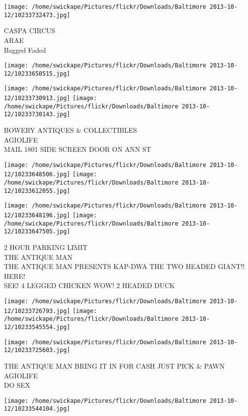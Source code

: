 \documentclass[10pt,letterpaper]{article}
\begin{document}
\texttt{[image: /home/swickape/Pictures/flickr/Downloads/Baltimore 2013-10-12/10233732473.jpg]}

CASPA CIRCUS\\
ARAE\\
Bagged Faded
\pagebreak

\texttt{[image: /home/swickape/Pictures/flickr/Downloads/Baltimore 2013-10-12/10233650515.jpg]}

\vspace{0.25in}
\texttt{[image: /home/swickape/Pictures/flickr/Downloads/Baltimore 2013-10-12/10233730913.jpg]}
\texttt{[image: /home/swickape/Pictures/flickr/Downloads/Baltimore 2013-10-12/10233730143.jpg]}

BOWERY ANTIQUES \& COLLECTIBLES\\
AGIOLIFE\\
MAIL 1801 SIDE SCREEN DOOR ON ANN ST
\pagebreak

\texttt{[image: /home/swickape/Pictures/flickr/Downloads/Baltimore 2013-10-12/10233648506.jpg]}
\texttt{[image: /home/swickape/Pictures/flickr/Downloads/Baltimore 2013-10-12/10233612055.jpg]}

\texttt{[image: /home/swickape/Pictures/flickr/Downloads/Baltimore 2013-10-12/10233648196.jpg]}
\texttt{[image: /home/swickape/Pictures/flickr/Downloads/Baltimore 2013-10-12/10233647505.jpg]}

2 HOUR PARKING LIMIT\\
THE ANTIQUE MAN\\
THE ANTIQUE MAN PRESENTS KAP{-}DWA THE TWO HEADED GIANT!! HERE!\\
SEE! 4 LEGGED CHICKEN WOW! 2 HEADED DUCK
\pagebreak

\texttt{[image: /home/swickape/Pictures/flickr/Downloads/Baltimore 2013-10-12/10233726793.jpg]}
\texttt{[image: /home/swickape/Pictures/flickr/Downloads/Baltimore 2013-10-12/10233545554.jpg]}

\texttt{[image: /home/swickape/Pictures/flickr/Downloads/Baltimore 2013-10-12/10233725603.jpg]}

THE ANTIQUE MAN BRING IT IN FOR CASH JUST PICK \& PAWN\\
AGIOLIFE\\
DO SEX
\pagebreak

\texttt{[image: /home/swickape/Pictures/flickr/Downloads/Baltimore 2013-10-12/10233544104.jpg]}
\end{document}
